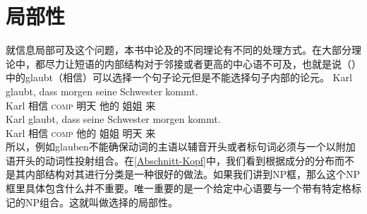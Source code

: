 
\largerpage[2]
\section{局部性}
\label{Abschnitt-Diskussion-Lokalitaet}\label{sec-locality}

就信息局部可及这个问题，本书中论及的不同理论有不同的处理方式。在大部分理论中，都尽力让短语的内部结构对于邻接或者更高的中心语不可及，也就是说（）中的glaubt（相信）可以选择一个句子论元但是不能选择句子内部的论元。
\eal
\ex 
\gll Karl glaubt, dass morgen seine Schwester kommt.\\
	 Karl 相信 \textsc{comp} 明天 他的 姐姐 来\\
\ex 
\gll Karl glaubt, dass seine Schwester morgen kommt.\\
	 Karl 相信 \textsc{comp} 他的 姐姐 明天 来\\
\zl
所以，例如glauben不能确保动词的主语以辅音开头或者标句词必须与一个以附加语开头的动词性投射组合。在\ref{Abschnitt-Kopf}中，我们看到根据成分的分布而不是其内部结构对其进行分类是一种很好的做法。如果我们讲到NP框，那么这个NP框里具体包含什么并不重要。唯一重要的是一个给定中心语要与一个带有特定格标记的NP组合。这就叫做选择的局部性。

